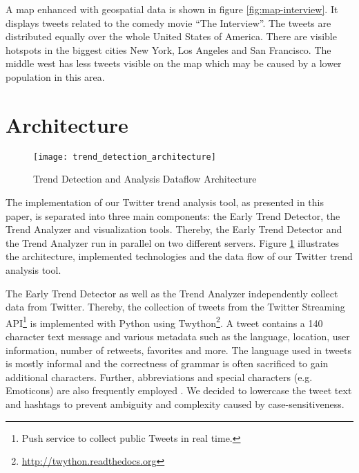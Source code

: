 A map enhanced with geospatial data is shown in figure \ref{fig:map-interview}. It displays tweets related to the comedy movie \enquote{The Interview}. The tweets are distributed equally over the whole United States of America. There are visible hotspots in the biggest cities New York, Los Angeles and San Francisco. The middle west has less tweets visible on the map which may be caused by a lower population in this area.

\section{Architecture}
\label{sec:architecture}

\begin{figure}[H]
  \centering
        \texttt{[image: trend\_detection\_architecture]}
  \caption[Trend Detection and Analysis Dataflow Architecture]{Trend Detection and Analysis Dataflow Architecture}
  \label{fig:twitter-trend-analysis-architecture}
\end{figure}


The implementation of our Twitter trend analysis tool, as presented in this paper, is separated into three main components: the Early Trend Detector, the Trend Analyzer and visualization tools. Thereby, the Early Trend Detector and the Trend Analyzer run in parallel on two different servers. Figure \ref{fig:twitter-trend-analysis-architecture} illustrates the architecture, implemented technologies and the data flow of our Twitter trend analysis tool.

The Early Trend Detector as well as the Trend Analyzer independently collect data from Twitter. Thereby, the collection of tweets from the Twitter Streaming API\footnote{Push service to collect public Tweets in real time.} is implemented with Python using Twython\footnote{\url{http://twython.readthedocs.org} \accessednote}. A tweet contains a 140 character text message and various metadata such as the language, location, user information, number of retweets, favorites and more. The language used in tweets is mostly informal and the correctness of grammar is often sacrificed to gain additional characters. Further, abbreviations and special characters (e.g. Emoticons) are also frequently employed \cite[67]{TwitterDataAnalytics2013}. We decided to lowercase the tweet text and hashtags to prevent ambiguity and complexity caused by case-sensitiveness. 

